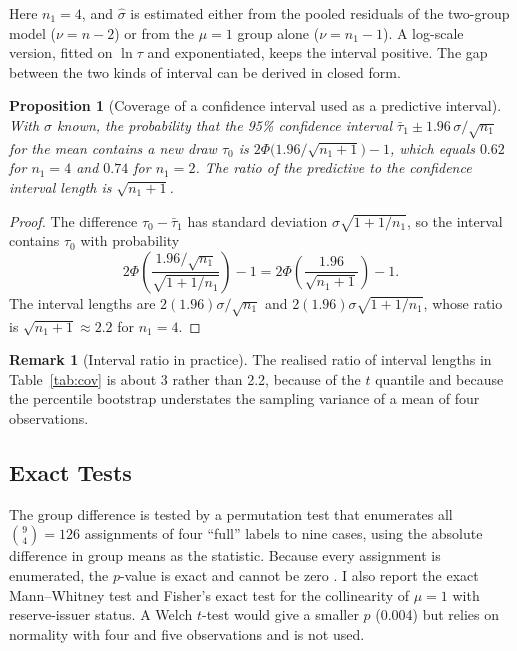 \documentclass[11pt,letterpaper]{article}
\theoremstyle{definition}
\newtheorem{remark}[definition]{Remark}
\theoremstyle{plain}
\newtheorem{proposition}[definition]{Proposition}
\begin{document}
Here $n_1=4$, and $\hat\sigma$ is estimated either from the pooled residuals of the two-group model ($\nu=n-2$) or from the $\mu=1$ group alone ($\nu=n_1-1$). A log-scale version, fitted on $\ln\tau$ and exponentiated, keeps the interval positive. The gap between the two kinds of interval can be derived in closed form.

\begin{proposition}[Coverage of a confidence interval used as a predictive interval]\label{prop:cov}
With $\sigma$ known, the probability that the 95\% confidence interval $\bar\tau_1\pm1.96\,\sigma/\sqrt{n_1}$ for the mean contains a new draw $\tau_0$ is $2\Phi\!\big(1.96/\sqrt{n_1+1}\big)-1$, which equals $0.62$ for $n_1=4$ and $0.74$ for $n_1=2$. The ratio of the predictive to the confidence interval length is $\sqrt{n_1+1}$.
\end{proposition}

\begin{proof}
The difference $\tau_0-\bar\tau_1$ has standard deviation $\sigma\sqrt{1+1/n_1}$, so the interval contains $\tau_0$ with probability
\[
2\Phi\!\left(\frac{1.96/\sqrt{n_1}}{\sqrt{1+1/n_1}}\right)-1=2\Phi\!\left(\frac{1.96}{\sqrt{n_1+1}}\right)-1.
\]
The interval lengths are $2(1.96)\sigma/\sqrt{n_1}$ and $2(1.96)\sigma\sqrt{1+1/n_1}$, whose ratio is $\sqrt{n_1+1}\approx2.2$ for $n_1=4$.
\end{proof}

\begin{remark}[Interval ratio in practice]\label{rem:ratio}
The realised ratio of interval lengths in Table~\ref{tab:cov} is about 3 rather than 2.2, because of the $t$ quantile and because the percentile bootstrap understates the sampling variance of a mean of four observations.
\end{remark}

\subsection{Exact Tests}\label{sec:exact}
The group difference is tested by a permutation test that enumerates all $\binom94=126$ assignments of four ``full'' labels to nine cases, using the absolute difference in group means as the statistic. Because every assignment is enumerated, the $p$-value is exact and cannot be zero \citep{phipson2010}. I also report the exact Mann--Whitney test \citep{mann1947} and Fisher's exact test \citep{fisher1922} for the collinearity of $\mu=1$ with reserve-issuer status. A Welch $t$-test would give a smaller $p$ (0.004) but relies on normality with four and five observations and is not used.
\end{document}
